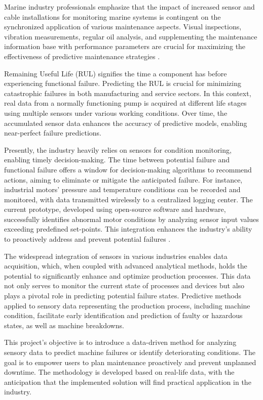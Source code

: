 Marine industry professionals emphasize that the impact of increased sensor and cable installations for monitoring marine systems is contingent on the synchronized application of various maintenance aspects. Visual inspections, vibration measurements, regular oil analysis, and supplementing the maintenance information base with performance parameters are crucial for maximizing the effectiveness of predictive maintenance strategies \cite{kimera_predictive_2020}.

Remaining Useful Life (RUL) signifies the time a component has before experiencing functional failure. Predicting the RUL is crucial for minimizing catastrophic failures in both manufacturing and service sectors. In this context, real data from a normally functioning pump is acquired at different life stages using multiple sensors under various working conditions. Over time, the accumulated sensor data enhances the accuracy of predictive models, enabling near-perfect failure predictions.

Presently, the industry heavily relies on sensors for condition monitoring, enabling timely decision-making. The time between potential failure and functional failure offers a window for decision-making algorithms to recommend actions, aiming to eliminate or mitigate the anticipated failure. For instance, industrial motors' pressure and temperature conditions can be recorded and monitored, with data transmitted wirelessly to a centralized logging center. The current prototype, developed using open-source software and hardware, successfully identifies abnormal motor conditions by analyzing sensor input values exceeding predefined set-points. This integration enhances the industry's ability to proactively address and prevent potential failures \cite{kimera_predictive_2020}.

The widespread integration of sensors in various industries enables data acquisition, which, when coupled with advanced analytical methods, holds the potential to significantly enhance and optimize production processes. This data not only serves to monitor the current state of processes and devices but also plays a pivotal role in predicting potential failure states. Predictive methods applied to sensory data representing the production process, including machine condition, facilitate early identification and prediction of faulty or hazardous states, as well as machine breakdowns.

This project's objective is to introduce a data-driven method for analyzing sensory data to predict machine failures or identify deteriorating conditions. The goal is to empower users to plan maintenance proactively and prevent unplanned downtime. The methodology is developed based on real-life data, with the anticipation that the implemented solution will find practical application in the industry.


